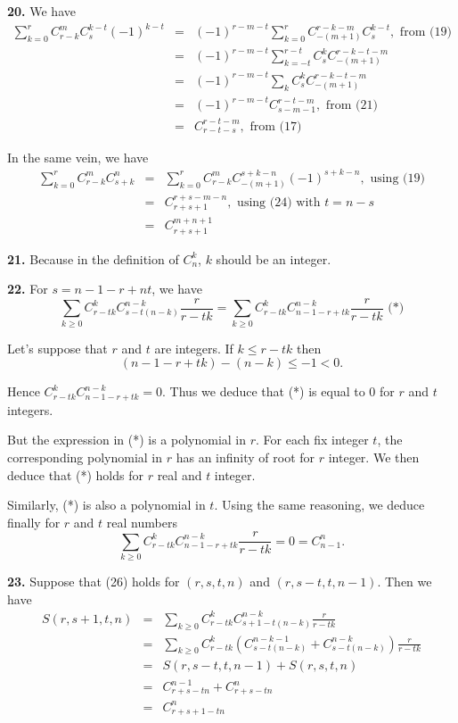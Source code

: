 \documentclass[a4paper,12pt]{article}
\newcommand{\newpar}[1]{\bigskip \noindent \textbf{#1.}}
\begin{document}
\newpar{20} We have
\begin{eqnarray*}
  \sum_{k=0}^r C_{r-k}^m C_s^{k-t} (-1)^{k-t} &=&
  (-1)^{r-m-t} \sum_{k=0}^r C_{-(m+1)}^{r-k-m} C_s^{k-t},\mbox{ from
    (19)} \\
  &=& (-1)^{r-m-t} \sum_{k=-t}^{r-t} C_s^k C_{-(m+1)}^{r-k-t-m} \\
  &=& (-1)^{r-m-t} \sum_k C_s^k C_{-(m+1)}^{r-k-t-m} \\
  &=& (-1)^{r-m-t} C_{s-m-1}^{r-t-m}, \mbox{ from (21)} \\
  &=& C_{r-t-s}^{r-t-m},\mbox{ from (17)}
\end{eqnarray*}

In the same vein, we have
\begin{eqnarray*}
  \sum_{k=0}^r C_{r-k}^m C_{s+k}^n &=& \sum_{k=0}^r C_{r-k}^m
  C_{-(m+1)}^{s+k-n} (-1)^{s+k-n}, \mbox{ using (19)} \\
  &=& C_{r+s+1}^{r+s-m-n}, \mbox{ using (24) with $t = n-s$} \\
  &=& C_{r+s+1}^{m+n+1}
\end{eqnarray*}

\newpar{21} Because in the definition of $C_n^k$, $k$ should be an
integer.

\newpar{22} For $s = n-1-r+nt$, we have
\[\sum_{k\ge 0} C_{r-tk}^k C_{s-t(n-k)}^{n-k} \frac{r}{r-tk} = \sum_{k\ge 0} C_{r-tk}^k
  C_{n-1-r+tk}^{n-k} \frac{r}{r-tk} \mbox{ (*)}\]

Let's suppose that $r$ and $t$ are integers. If $k \le r - tk$ then
\[ (n-1-r+tk) - (n-k) \le -1 < 0.\]

Hence $C_{r-tk}^k C_{n-1-r+tk}^{n-k} = 0$.  Thus we deduce that (*) is
equal to $0$ for $r$ and $t$ integers.

But the expression in (*) is a polynomial in $r$.  For each fix integer
$t$, the corresponding polynomial in $r$ has an infinity of root for
$r$ integer.  We then deduce that (*) holds for $r$ real and $t$
integer.

Similarly, (*) is also a polynomial in $t$.  Using the same reasoning,
we deduce finally for $r$ and $t$ real numbers
\[\sum_{k\ge 0} C_{r-tk}^k C_{n-1-r+tk}^{n-k} \frac{r}{r-tk} = 0 =
C_{n-1}^n.\]

\newpar{23}  Suppose that (26) holds for $(r,s,t,n)$ and
$(r,s-t,t,n-1)$.  Then we have
\begin{eqnarray*}
  S(r,s+1,t,n) &=& \sum_{k\ge 0} C_{r-tk}^k C_{s+1-t(n-k)}^{n-k}
  \frac{r}{r-tk}\\
  &=& \sum_{k\ge 0} C_{r-tk}^k \left( C_{s-t(n-k)}^{n-k-1} +
  C_{s-t(n-k)}^{n-k}\right) \frac{r}{r-tk} \\
  &=& S(r,s-t,t,n-1) + S(r,s,t,n) \\
  &=& C_{r+s-tn}^{n-1} + C_{r+s-tn}^n \\
  &=& C_{r+s+1-tn}^n
\end{eqnarray*}
\end{document}
